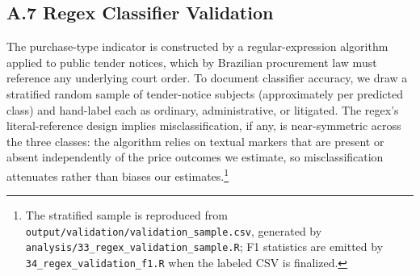 \subsection*{A.7 Regex Classifier Validation}
\label{sec:appendix_regex}

The purchase-type indicator is constructed by a regular-expression algorithm applied to public tender notices, which by Brazilian procurement law must reference any underlying court order. To document classifier accuracy, we draw a stratified random sample of \BPregexNotices{} tender-notice subjects (approximately \BPregexPerClass{} per predicted class) and hand-label each as ordinary, administrative, or litigated. \BPregexValidationStatus{} The regex's literal-reference design implies misclassification, if any, is near-symmetric across the three classes: the algorithm relies on textual markers that are present or absent independently of the price outcomes we estimate, so misclassification attenuates rather than biases our estimates.\footnote{The stratified sample is reproduced from \texttt{output/validation/validation\_sample.csv}, generated by \texttt{analysis/33\_regex\_validation\_sample.R}; F1 statistics are emitted by \texttt{34\_regex\_validation\_f1.R} when the labeled CSV is finalized.}

